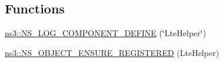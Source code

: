 \subsection*{Functions}
\begin{DoxyCompactItemize}
\item 
\hyperlink{namespacens3_ad5e59eb9e15e7a49a2110e9845b5c2f8}{ns3\+::\+N\+S\+\_\+\+L\+O\+G\+\_\+\+C\+O\+M\+P\+O\+N\+E\+N\+T\+\_\+\+D\+E\+F\+I\+NE} (\char`\"{}Lte\+Helper\char`\"{})
\item 
\hyperlink{namespacens3_a8a06a5e1b51bdac63559f9b2189a7d31}{ns3\+::\+N\+S\+\_\+\+O\+B\+J\+E\+C\+T\+\_\+\+E\+N\+S\+U\+R\+E\+\_\+\+R\+E\+G\+I\+S\+T\+E\+R\+ED} (Lte\+Helper)
\end{DoxyCompactItemize}
